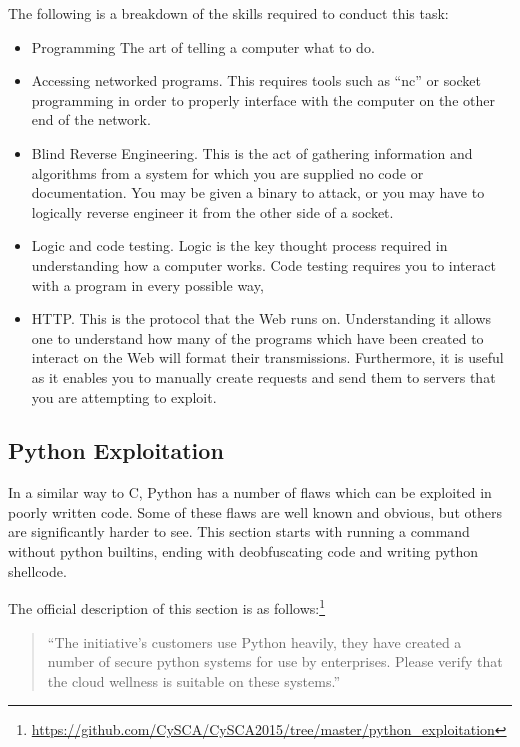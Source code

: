 \documentclass[a4paper,11pt]{report}
\begin{document}
			The following is a breakdown of the skills required to conduct this task:
			\begin{itemize}
				\item Programming
					The art of telling a computer what to do. 
				\item Accessing networked programs. 
					This requires tools such as ``nc'' or socket programming in order to properly interface with the computer on the other end of the network. 
				\item Blind Reverse Engineering. 
					This is the act of gathering information and algorithms from a system for which you are supplied no code or documentation. 
					You may be given a binary to attack, or you may have to logically reverse engineer it from the other side of a socket. 
				\item Logic and code testing. 
					Logic is the key thought process required in understanding how a computer works. 
					Code testing requires you to interact with a program in every possible way, 
				\item HTTP. 
					This is the protocol that the Web runs on. 
					Understanding it allows one to understand how many of the programs which have been created to interact on the Web will format their transmissions. 
					Furthermore, it is useful as it enables you to manually create requests and send them to servers that you are attempting to exploit. 
			\end{itemize}

		\subsection{Python Exploitation}
			In a similar way to C, Python has a number of flaws which can be exploited in poorly written code. 
			Some of these flaws are well known and obvious, but others are significantly harder to see. 
			This section starts with running a command without python builtins, ending with deobfuscating code and writing python shellcode. 

			The official description of this section is as follows:\footnote{\url{https://github.com/CySCA/CySCA2015/tree/master/python\_exploitation}}
			\begin{quote}
				``The initiative's customers use Python heavily, they have created a number of secure python systems for use by enterprises. Please verify that the cloud wellness is suitable on these systems.''
			\end{quote}
\end{document}
